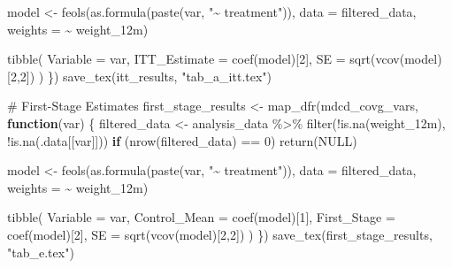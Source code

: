 \documentclass[
  letterpaper,
  DIV=11,
  numbers=noendperiod]{scrartcl}
\newenvironment{Shaded}{\begin{snugshade}}{\end{snugshade}}
\newcommand{\AttributeTok}[1]{\textcolor[rgb]{0.40,0.45,0.13}{#1}}
\newcommand{\CommentTok}[1]{\textcolor[rgb]{0.37,0.37,0.37}{#1}}
\newcommand{\ConstantTok}[1]{\textcolor[rgb]{0.56,0.35,0.01}{#1}}
\newcommand{\ControlFlowTok}[1]{\textcolor[rgb]{0.00,0.23,0.31}{\textbf{#1}}}
\newcommand{\DecValTok}[1]{\textcolor[rgb]{0.68,0.00,0.00}{#1}}
\newcommand{\FunctionTok}[1]{\textcolor[rgb]{0.28,0.35,0.67}{#1}}
\newcommand{\NormalTok}[1]{\textcolor[rgb]{0.00,0.23,0.31}{#1}}
\newcommand{\OtherTok}[1]{\textcolor[rgb]{0.00,0.23,0.31}{#1}}
\newcommand{\SpecialCharTok}[1]{\textcolor[rgb]{0.37,0.37,0.37}{#1}}
\newcommand{\StringTok}[1]{\textcolor[rgb]{0.13,0.47,0.30}{#1}}
\begin{document}
\begin{Shaded}
\begin{Highlighting}[]
\NormalTok{  model }\OtherTok{\textless{}{-}} \FunctionTok{feols}\NormalTok{(}\FunctionTok{as.formula}\NormalTok{(}\FunctionTok{paste}\NormalTok{(var, }\StringTok{"\textasciitilde{} treatment"}\NormalTok{)), }
                 \AttributeTok{data =}\NormalTok{ filtered\_data, }
                 \AttributeTok{weights =} \SpecialCharTok{\textasciitilde{}}\NormalTok{ weight\_12m)}
  
  \FunctionTok{tibble}\NormalTok{(}
    \AttributeTok{Variable =}\NormalTok{ var,}
    \AttributeTok{ITT\_Estimate =} \FunctionTok{coef}\NormalTok{(model)[}\DecValTok{2}\NormalTok{],}
    \AttributeTok{SE =} \FunctionTok{sqrt}\NormalTok{(}\FunctionTok{vcov}\NormalTok{(model)[}\DecValTok{2}\NormalTok{,}\DecValTok{2}\NormalTok{])}
\NormalTok{  )}
\NormalTok{\})}
\FunctionTok{save\_tex}\NormalTok{(itt\_results, }\StringTok{"tab\_a\_itt.tex"}\NormalTok{)}

\CommentTok{\# First{-}Stage Estimates}
\NormalTok{first\_stage\_results }\OtherTok{\textless{}{-}} \FunctionTok{map\_dfr}\NormalTok{(mdcd\_covg\_vars, }\ControlFlowTok{function}\NormalTok{(var) \{}
\NormalTok{  filtered\_data }\OtherTok{\textless{}{-}}\NormalTok{ analysis\_data }\SpecialCharTok{\%\textgreater{}\%} \FunctionTok{filter}\NormalTok{(}\SpecialCharTok{!}\FunctionTok{is.na}\NormalTok{(weight\_12m), }\SpecialCharTok{!}\FunctionTok{is.na}\NormalTok{(.data[[var]]))}
  \ControlFlowTok{if}\NormalTok{ (}\FunctionTok{nrow}\NormalTok{(filtered\_data) }\SpecialCharTok{==} \DecValTok{0}\NormalTok{) }\FunctionTok{return}\NormalTok{(}\ConstantTok{NULL}\NormalTok{)}
  
\NormalTok{  model }\OtherTok{\textless{}{-}} \FunctionTok{feols}\NormalTok{(}\FunctionTok{as.formula}\NormalTok{(}\FunctionTok{paste}\NormalTok{(var, }\StringTok{"\textasciitilde{} treatment"}\NormalTok{)), }
                 \AttributeTok{data =}\NormalTok{ filtered\_data, }
                 \AttributeTok{weights =} \SpecialCharTok{\textasciitilde{}}\NormalTok{ weight\_12m)}
  
  \FunctionTok{tibble}\NormalTok{(}
    \AttributeTok{Variable =}\NormalTok{ var,}
    \AttributeTok{Control\_Mean =} \FunctionTok{coef}\NormalTok{(model)[}\DecValTok{1}\NormalTok{],}
    \AttributeTok{First\_Stage =} \FunctionTok{coef}\NormalTok{(model)[}\DecValTok{2}\NormalTok{],}
    \AttributeTok{SE =} \FunctionTok{sqrt}\NormalTok{(}\FunctionTok{vcov}\NormalTok{(model)[}\DecValTok{2}\NormalTok{,}\DecValTok{2}\NormalTok{])}
\NormalTok{  )}
\NormalTok{\})}
\FunctionTok{save\_tex}\NormalTok{(first\_stage\_results, }\StringTok{"tab\_e.tex"}\NormalTok{)}


\end{Highlighting}
\end{Shaded}
\end{document}
